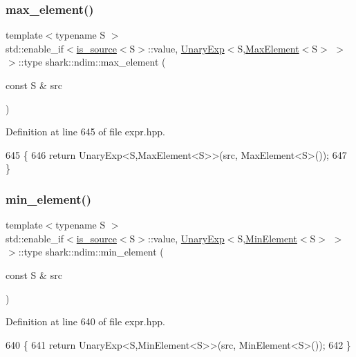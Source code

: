\subsubsection{\texorpdfstring{max\+\_\+element()}{max\_element()}}
{\footnotesize\ttfamily template$<$typename S $>$ \\
std\+::enable\+\_\+if$<$\hyperlink{classshark_1_1ndim_1_1is__source}{is\+\_\+source}$<$S$>$\+::value, \hyperlink{classshark_1_1ndim_1_1_unary_exp}{Unary\+Exp}$<$S,\hyperlink{classshark_1_1ndim_1_1_max_element}{Max\+Element}$<$S$>$ $>$ $>$\+::type shark\+::ndim\+::max\+\_\+element (\begin{DoxyParamCaption}\item[{const S \&}]{src }\end{DoxyParamCaption})}



Definition at line 645 of file expr.\+hpp.


\begin{DoxyCode}
645                                                                                                           \{
646             \textcolor{keywordflow}{return} UnaryExp<S,MaxElement<S>>(src, MaxElement<S>());
647         \}
\end{DoxyCode}
\hypertarget{namespaceshark_1_1ndim_a4c389b16fefd6eef118bb0c46fa50379}{}\label{namespaceshark_1_1ndim_a4c389b16fefd6eef118bb0c46fa50379} 
\subsubsection{\texorpdfstring{min\+\_\+element()}{min\_element()}}
{\footnotesize\ttfamily template$<$typename S $>$ \\
std\+::enable\+\_\+if$<$\hyperlink{classshark_1_1ndim_1_1is__source}{is\+\_\+source}$<$S$>$\+::value, \hyperlink{classshark_1_1ndim_1_1_unary_exp}{Unary\+Exp}$<$S,\hyperlink{classshark_1_1ndim_1_1_min_element}{Min\+Element}$<$S$>$ $>$ $>$\+::type shark\+::ndim\+::min\+\_\+element (\begin{DoxyParamCaption}\item[{const S \&}]{src }\end{DoxyParamCaption})}



Definition at line 640 of file expr.\+hpp.


\begin{DoxyCode}
640                                                                                                           \{
641             \textcolor{keywordflow}{return} UnaryExp<S,MinElement<S>>(src, MinElement<S>());
642         \}
\end{DoxyCode}
\hypertarget{namespaceshark_1_1ndim_a6daa18cea8b9b37f3525eb0416bbb203}{}\label{namespaceshark_1_1ndim_a6daa18cea8b9b37f3525eb0416bbb203} 
